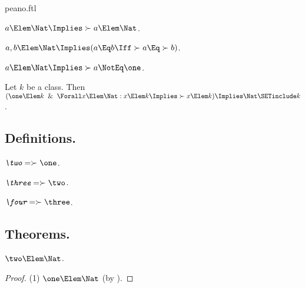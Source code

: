 \documentclass{stex}
\begin{document}
\begin{smodule}{peano.ftl}
\begin{forthel}
  \begin{axiom*}[title=6,name=P6]
    $a \Elem \Nat \Implies \succ{a} \Elem \Nat$.
  \end{axiom*}
  
  \begin{axiom*}[title=7,name=P7]
    $a,b \Elem \Nat \Implies (a \Eq b \Iff \succ{a} \Eq \succ{b})$.
  \end{axiom*}
  
  \begin{axiom*}[title=8,name=P8]
    $a \Elem \Nat \Implies \succ{a} \NotEq \one$.
  \end{axiom*}
  
  \begin{axiom*}[title=9,name=P9]
    Let $k$ be a class.
    Then $(\one \Elem k \And \Forall x \Elem \Nat: x \Elem k \Implies \succ{x} \Elem k) \Implies \Nat \SETinclude k$.
  \end{axiom*}
\end{forthel}


\subsection{Definitions.}

\begin{forthel}
  \begin{definition*}[title=10.i,for=two]
    $\emph{\two} = \succ{\one}$.
  \end{definition*}

  \begin{definition*}[title=10.ii,for=three]
    $\emph{\three} = \succ{\two}$.
  \end{definition*}
  
  \begin{definition*}[title=10.iii,for=four]
    $\emph{\four} = \succ{\three}$.
  \end{definition*}
\end{forthel}


\subsection{Theorems.}


\begin{forthel}
  \begin{theorem*}[title=11,name=P11]
    $\two \Elem \Nat$.
  \end{theorem*}
  \begin{proof}
    (1) $\one \Elem \Nat$ (by ).


\end{proof}
\end{forthel}
\end{smodule}
\end{document}
